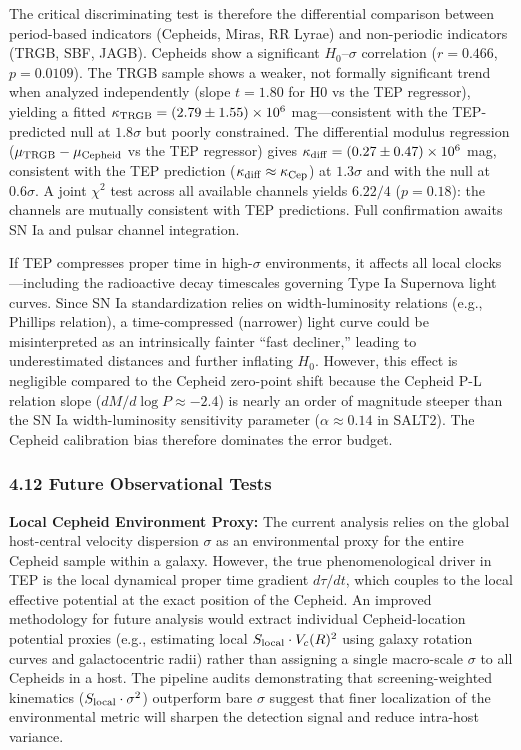 \documentclass[
]{article}
\begin{document}
The critical discriminating test is therefore the differential
comparison between period-based indicators (Cepheids, Miras, RR Lyrae)
and non-periodic indicators (TRGB, SBF, JAGB). Cepheids show a
significant \(H_0\)--\(\sigma\) correlation (\(r=0.466\), \(p=0.0109\)).
The TRGB sample shows a weaker, not formally significant trend when
analyzed independently (slope \(t=1.80\) for H0 vs the TEP regressor),
yielding a fitted \(\kappa_{\rm TRGB} = (2.79 \pm 1.55)\times10^6\)
mag---consistent with the TEP-predicted null at \(1.8\sigma\) but poorly
constrained. The differential modulus regression
(\(\mu_{\rm TRGB} - \mu_{\rm Cepheid}\) vs the TEP regressor) gives
\(\kappa_{\rm diff} = (0.27 \pm 0.47)\times10^6\) mag, consistent with
the TEP prediction (\(\kappa_{\rm diff} \approx
\kappa_{\rm Cep}\)) at \(1.3\sigma\) and with the null at \(0.6\sigma\).
A joint \(\chi^2\) test across all available channels yields \(6.22/4\)
(\(p=0.18\)): the channels are mutually consistent with TEP predictions.
Full confirmation awaits SN Ia and pulsar channel integration.

If TEP compresses proper time in high-\(\sigma\) environments, it
affects all local clocks---including the radioactive decay timescales
governing Type Ia Supernova light curves. Since SN Ia standardization
relies on width-luminosity relations (e.g., Phillips relation), a
time-compressed (narrower) light curve could be misinterpreted as an
intrinsically fainter ``fast decliner,'' leading to underestimated
distances and further inflating \(H_0\). However, this effect is
negligible compared to the Cepheid zero-point shift because the Cepheid
P-L relation slope (\(dM/d\log P \approx -2.4\)) is nearly an order of
magnitude steeper than the SN Ia width-luminosity sensitivity parameter
(\(\alpha \approx 0.14\) in SALT2). The Cepheid calibration bias
therefore dominates the error budget.

\subsubsection{4.12 Future Observational
Tests}\label{future-observational-tests}

\textbf{Local Cepheid Environment Proxy:} The current analysis relies on
the global host-central velocity dispersion \(\sigma\) as an
environmental proxy for the entire Cepheid sample within a galaxy.
However, the true phenomenological driver in TEP is the local dynamical
proper time gradient \(d\tau/dt\), which couples to the local effective
potential at the exact position of the Cepheid. An improved methodology
for future analysis would extract individual Cepheid-location potential
proxies (e.g., estimating local \(S_{\rm local} \cdot V_c(R)^2\) using
galaxy rotation curves and galactocentric radii) rather than assigning a
single macro-scale \(\sigma\) to all Cepheids in a host. The pipeline
audits demonstrating that screening-weighted kinematics
(\(S_{\rm local} \cdot \sigma^2\)) outperform bare \(\sigma\) suggest
that finer localization of the environmental metric will sharpen the
detection signal and reduce intra-host variance.
\end{document}
